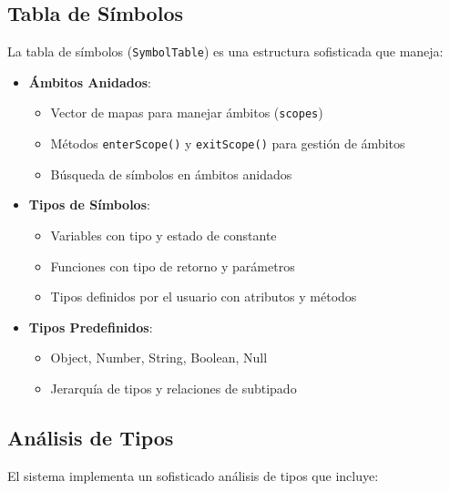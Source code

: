 \documentclass[11pt, a4paper, twoside]{article} %
\begin{document}
\subsection{Tabla de S\'imbolos}

La tabla de símbolos (\texttt{SymbolTable}) es una estructura sofisticada que maneja:

\begin{itemize}
    \item \textbf{\'Ambitos Anidados}:
    \begin{itemize}
        \item Vector de mapas para manejar ámbitos (\texttt{scopes})
        \item Métodos \texttt{enterScope()} y \texttt{exitScope()} para gestión de ámbitos
        \item Búsqueda de símbolos en ámbitos anidados
    \end{itemize}

    \item \textbf{Tipos de S\'imbolos}:
    \begin{itemize}
        \item Variables con tipo y estado de constante
        \item Funciones con tipo de retorno y parámetros
        \item Tipos definidos por el usuario con atributos y métodos
    \end{itemize}

    \item \textbf{Tipos Predefinidos}:
    \begin{itemize}
        \item Object, Number, String, Boolean, Null
        \item Jerarquía de tipos y relaciones de subtipado
    \end{itemize}
\end{itemize}

\subsection{An\'alisis de Tipos}

El sistema implementa un sofisticado análisis de tipos que incluye:
\end{document}
